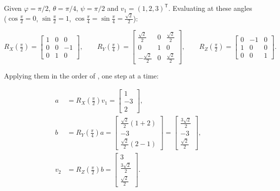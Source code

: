 Given $\varphi = \pi/2$, $\theta = \pi/4$, $\psi = \pi/2$ and
$v_1 = (1, 2, 3)^{\mathsf{T}}$. Evaluating
 at these angles
($\cos\frac{\pi}{2} = 0$, $\sin\frac{\pi}{2} = 1$,
$\cos\frac{\pi}{4} = \sin\frac{\pi}{4} = \frac{\sqrt{2}}{2}$):

\begin{equation*}
R_X\!\left(\tfrac{\pi}{2}\right) =
\begin{bmatrix} 1 & 0 & 0 \\ 0 & 0 & -1 \\ 0 & 1 & 0 \end{bmatrix},
\qquad
R_Y\!\left(\tfrac{\pi}{4}\right) =
\begin{bmatrix}
\frac{\sqrt{2}}{2} & 0 & \frac{\sqrt{2}}{2} \\
0 & 1 & 0 \\
-\frac{\sqrt{2}}{2} & 0 & \frac{\sqrt{2}}{2}
\end{bmatrix},
\qquad
R_Z\!\left(\tfrac{\pi}{2}\right) =
\begin{bmatrix} 0 & -1 & 0 \\ 1 & 0 & 0 \\ 0 & 0 & 1 \end{bmatrix}.
\end{equation*}

Applying them in the order of , one step at a time:

\begin{align*}
a &= R_X\!\left(\tfrac{\pi}{2}\right) v_1
   = \begin{bmatrix} 1 \\ -3 \\ 2 \end{bmatrix}, \\[4pt]
b &= R_Y\!\left(\tfrac{\pi}{4}\right) a
   = \begin{bmatrix}
       \frac{\sqrt{2}}{2}(1 + 2) \\ -3 \\ \frac{\sqrt{2}}{2}(2 - 1)
     \end{bmatrix}
   = \begin{bmatrix} \frac{3\sqrt{2}}{2} \\ -3 \\ \frac{\sqrt{2}}{2} \end{bmatrix}, \\[4pt]
v_2 &= R_Z\!\left(\tfrac{\pi}{2}\right) b
   = \begin{bmatrix} 3 \\ \frac{3\sqrt{2}}{2} \\ \frac{\sqrt{2}}{2} \end{bmatrix}.
\end{align*}

